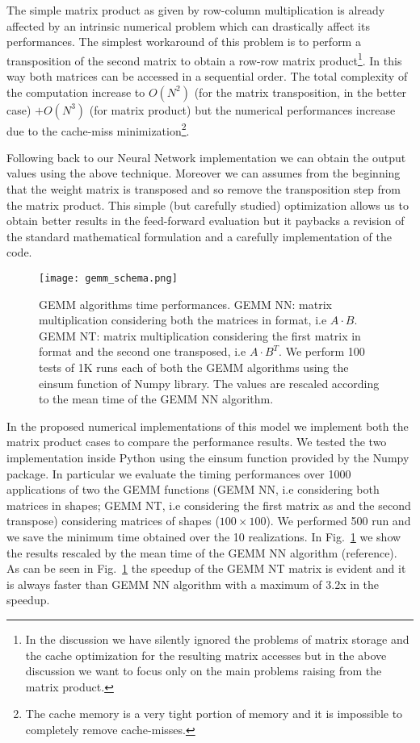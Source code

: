\documentclass{standalone}
\begin{document}
The simple matrix product as given by row-column multiplication is already affected by an intrinsic numerical problem which can drastically affect its performances.
The simplest workaround of this problem is to perform a transposition of the second matrix to obtain a row-row matrix product\footnote{
  In the discussion we have silently ignored the problems of matrix storage and the cache optimization for the resulting matrix accesses but in the above discussion we want to focus only on the main problems raising from the matrix product.
}.
In this way both matrices can be accessed in a sequential order.
The total complexity of the computation increase to $O(N^2)$ (for the matrix transposition, in the better case) $+ O(N^3)$ (for matrix product) but the numerical performances increase due to the cache-miss minimization\footnote{
  The cache memory is a very tight portion of memory and it is impossible to completely remove cache-misses.
}.

Following back to our Neural Network implementation we can obtain the output values using the above technique.
Moreover we can assumes from the beginning that the weight matrix is transposed and so remove the transposition step from the matrix product.
This simple (but carefully studied) optimization allows us to obtain better results in the feed-forward evaluation but it paybacks a revision of the standard mathematical formulation and a carefully implementation of the code.

\begin{figure}[htbp]
\texttt{[image: gemm\_schema.png]}
\quad
\centering
\def\svgwidth{0.45\textwidth}

\caption{GEMM algorithms time performances.
\textsf{GEMM NN}: matrix multiplication considering both the matrices in  format, i.e $A\cdot B$.
\textsf{GEMM NT}: matrix multiplication considering the first matrix in  format and the second one transposed, i.e $A\cdot B^T$.
We perform 100 tests of 1K runs each of both the \textsf{GEMM} algorithms using the \textsf{einsum} function of \textsf{Numpy} library.
The values are rescaled according to the mean time of the \textsf{GEMM NN} algorithm.
}
\label{fig:gemm}
\end{figure}

In the proposed numerical implementations of this model we implement both the matrix product cases to compare the performance results.
We tested the two implementation inside \textsf{Python} using the \textsf{einsum} function provided by the \textsf{Numpy} package.
In particular we evaluate the timing performances over 1000 applications of two the \textsf{GEMM} functions (\textsf{GEMM NN}, i.e considering both matrices in  shapes; \textsf{GEMM NT}, i.e considering the first matrix as  and the second transpose) considering matrices of shapes ($100\times100$).
We performed 500 run and we save the minimum time obtained over the 10 realizations.
In Fig.~\ref{fig:gemm} we show the results rescaled by the mean time of the \textsf{GEMM NN} algorithm (reference).
As can be seen in Fig.~\ref{fig:gemm} the speedup of the \textsf{GEMM NT} matrix is evident and it is always faster than GEMM NN algorithm with a maximum of 3.2x in the speedup.
\end{document}
